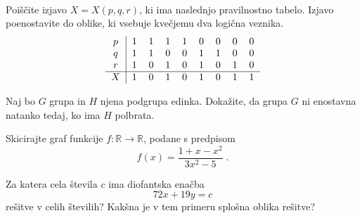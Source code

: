 \documentclass{izpit}
\begin{document}
\naloga[\tocke{$\tockeprve$}]

\\
\dodatek{}


\naloga[\tocke{$\tockedruge$}]

  \podnaloga[15]
    Poiščite izjavo $X = X(p, q, r)$, ki ima naslednjo pravilnostno tabelo.
    Izjavo poenostavite do oblike, ki vsebuje kvečjemu dva logična veznika.
    \[
      \begin{tabular}{c|cccccccc}
        $p$ & 1 & 1 & 1 & 1 & 0 & 0 & 0 & 0 \\
        $q$ & 1 & 1 & 0 & 0 & 1 & 1 & 0 & 0 \\
        $r$ & 1 & 0 & 1 & 0 & 1 & 0 & 1 & 0 \\\hline
        $X$ & 1 & 0 & 1 & 0 & 1 & 0 & 1 & 1 \\
      \end{tabular}
    \]
  
  \prostor[2] %

  \podnaloga[5]
    Naj bo $G$ grupa in $H$ njena podgrupa edinka. Dokažite, da grupa $G$ ni
    enostavna natanko tedaj, ko ima $H$ polbrata.

  \prostor

\naloga[\tocke{$\tocketretje$}]
  Skicirajte graf funkcije $f \colon \mathbb{R} \to \mathbb{R}$, podane s
  predpisom
  \[
    f(x) = \frac{1 + x - x^2}{3 x^2 - 5} \;.
  \]

  \dodatek{}


  Za katera cela števila $c$ ima diofantska enačba
  \[
    72 x + 19 y = c
  \]
  rešitve v celih številih? Kakšna je v tem primeru splošna oblika rešitve?
\end{document}
